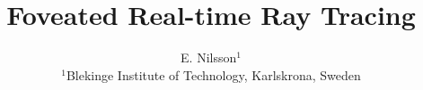 

\usepackage{gensymb} %
\usepackage{algorithm} %
\usepackage{algpseudocode} %
\usepackage{graphicx} %
\usepackage{hyperref} %
\usepackage{float} %
\usepackage{stfloats} %
\usepackage{pgf} %

\newcommand*{\no}[1]{%
    \pgfmathprintnumber[
        fixed,
        precision=3,
        fixed zerofill=true,
        ]{#1}}%


\let\OLDthebibliography\thebibliography
\renewcommand\thebibliography[1]{
  \OLDthebibliography{#1}
  \setlength{\parskip}{0pt}
  \setlength{\itemsep}{0pt plus 0.3ex}
}

\title[Foveated Real-time Ray Tracing]{Foveated Real-time Ray Tracing}

\author[E. Nilsson]
       {E. Nilsson$^{1}$\\
         $^1$Blekinge Institute of Technology, Karlskrona, Sweden
       }

%



\maketitle







{}



